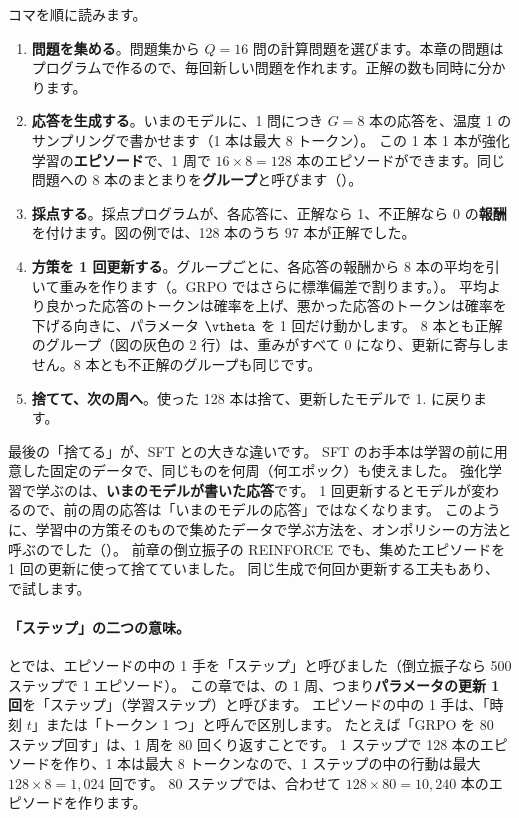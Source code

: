 コマを順に読みます。
\begin{enumerate}
\item \textbf{問題を集める}。問題集から $Q=16$ 問の計算問題を選びます。本章の問題はプログラムで作るので、毎回新しい問題を作れます。正解の数も同時に分かります。
\item \textbf{応答を生成する}。いまのモデルに、1 問につき $G=8$ 本の応答を、温度 1 のサンプリングで書かせます（1 本は最大 8 トークン）。
この 1 本 1 本が強化学習の\textbf{エピソード}で、1 周で $16\times8=128$ 本のエピソードができます。同じ問題への 8 本のまとまりを\textbf{グループ}と呼びます（）。
\item \textbf{採点する}。採点プログラムが、各応答に、正解なら 1、不正解なら 0 の\textbf{報酬}を付けます。図の例では、128 本のうち 97 本が正解でした。
\item \textbf{方策を 1 回更新する}。グループごとに、各応答の報酬から 8 本の平均を引いて重みを作ります（。GRPO ではさらに標準偏差で割ります。）。
平均より良かった応答のトークンは確率を上げ、悪かった応答のトークンは確率を下げる向きに、パラメータ $\vtheta$ を 1 回だけ動かします。
8 本とも正解のグループ（図の灰色の 2 行）は、重みがすべて 0 になり、更新に寄与しません。8 本とも不正解のグループも同じです。
\item \textbf{捨てて、次の周へ}。使った 128 本は捨て、更新したモデルで 1. に戻ります。
\end{enumerate}

最後の「捨てる」が、SFT との大きな違いです。
SFT のお手本は学習の前に用意した固定のデータで、同じものを何周（何エポック）も使えました。
強化学習で学ぶのは、\textbf{いまのモデルが書いた応答}です。
1 回更新するとモデルが変わるので、前の周の応答は「いまのモデルの応答」ではなくなります。
このように、学習中の方策そのもので集めたデータで学ぶ方法を、オンポリシーの方法と呼ぶのでした（）。
前章の倒立振子の REINFORCE でも、集めたエピソードを 1 回の更新に使って捨てていました。
同じ生成で何回か更新する工夫もあり、で試します。

\paragraph{「ステップ」の二つの意味。}
とでは、エピソードの中の 1 手を「ステップ」と呼びました（倒立振子なら 500 ステップで 1 エピソード）。
この章では、の 1 周、つまり\textbf{パラメータの更新 1 回}を「ステップ」（学習ステップ）と呼びます。
エピソードの中の 1 手は、「時刻 $t$」または「トークン 1 つ」と呼んで区別します。
たとえば「GRPO を 80 ステップ回す」は、1 周を 80 回くり返すことです。
1 ステップで 128 本のエピソードを作り、1 本は最大 8 トークンなので、1 ステップの中の行動は最大 $128\times8=1{,}024$ 回です。
80 ステップでは、合わせて $128\times80=10{,}240$ 本のエピソードを作ります。

